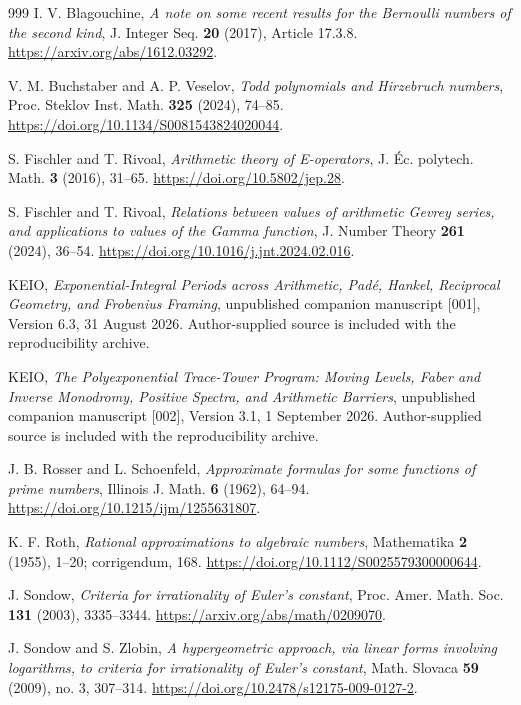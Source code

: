 \documentclass[11pt,a4paper]{article}
\theoremstyle{definition}
\theoremstyle{remark}
\numberwithin{equation}{section}
\begin{document}
\begin{thebibliography}{999}
I. V. Blagouchine,
\emph{A note on some recent results for the Bernoulli numbers of the
second kind}, J. Integer Seq. \textbf{20} (2017), Article 17.3.8.
\url{https://arxiv.org/abs/1612.03292}.

V. M. Buchstaber and A. P. Veselov,
\emph{Todd polynomials and Hirzebruch numbers},
Proc. Steklov Inst. Math. \textbf{325} (2024), 74--85.
\url{https://doi.org/10.1134/S0081543824020044}.

S. Fischler and T. Rivoal,
\emph{Arithmetic theory of E-operators},
J. \'Ec. polytech. Math. \textbf{3} (2016), 31--65.
\url{https://doi.org/10.5802/jep.28}.

S. Fischler and T. Rivoal,
\emph{Relations between values of arithmetic Gevrey series, and
applications to values of the Gamma function},
J. Number Theory \textbf{261} (2024), 36--54.
\url{https://doi.org/10.1016/j.jnt.2024.02.016}.

KEIO,
\emph{Exponential-Integral Periods across Arithmetic, Pad\'e, Hankel,
Reciprocal Geometry, and Frobenius Framing},
unpublished companion manuscript [001], Version 6.3, 31 August 2026.
Author-supplied source is included with the reproducibility archive.

KEIO,
\emph{The Polyexponential Trace-Tower Program: Moving Levels,
Faber and Inverse Monodromy, Positive Spectra, and Arithmetic Barriers},
unpublished companion manuscript [002], Version 3.1, 1 September 2026.
Author-supplied source is included with the reproducibility archive.

J. B. Rosser and L. Schoenfeld,
\emph{Approximate formulas for some functions of prime numbers},
Illinois J. Math. \textbf{6} (1962), 64--94.
\url{https://doi.org/10.1215/ijm/1255631807}.

K. F. Roth,
\emph{Rational approximations to algebraic numbers},
Mathematika \textbf{2} (1955), 1--20; corrigendum, 168.
\url{https://doi.org/10.1112/S0025579300000644}.

J. Sondow,
\emph{Criteria for irrationality of Euler's constant},
Proc. Amer. Math. Soc. \textbf{131} (2003), 3335--3344.
\url{https://arxiv.org/abs/math/0209070}.

J. Sondow and S. Zlobin,
\emph{A hypergeometric approach, via linear forms involving logarithms,
to criteria for irrationality of Euler's constant},
Math. Slovaca \textbf{59} (2009), no. 3, 307--314.
\url{https://doi.org/10.2478/s12175-009-0127-2}.


\end{thebibliography}
\end{document}
